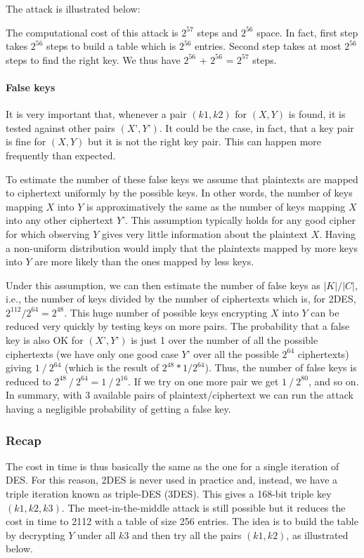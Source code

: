 The attack is illustrated below:


The computational cost of this attack is $2^{57}$ steps and $2^{56}$ space. In fact, first step takes $2^{56}$ steps to build a table which is $2^{56}$ entries. Second step takes at most $2^{56}$ steps to find the right key. We thus have $2^{56}$ + $2^{56}$ = $2^{57}$ steps.

\paragraph{False keys}

It is very important that, whenever a pair $(k1,k2)$ for $(X,Y)$ is found, it is tested against other pairs $(X’,Y’)$. It could be the case, in fact, that a key pair is fine for $(X,Y)$ but it is not the right key pair. This can happen more frequently than expected. 

To estimate the number of these false keys we assume that plaintexts are mapped to ciphertext uniformly by the possible keys. In other words, the number of keys mapping $X$ into $Y$ is approximatively the same as the number of keys mapping $X$ into any other ciphertext $Y’$. This assumption typically holds for any good cipher for which observing $Y$ gives very little information about the plaintext $X$. Having a non-uniform distribution would imply that the plaintexts mapped by more keys into $Y$ are more likely than the ones mapped by less keys.

Under this assumption, we can then estimate the number of false keys as $|K|/|C|$, i.e., the number of keys divided by the number of ciphertexts which is, for 2DES, $2^{112}/2^{64} = 2^{48}$. This huge number of possible keys encrypting $X$ into $Y$ can be reduced very quickly by testing keys on more pairs. The probability that a false key is also OK for $(X’,Y’)$ is just 1 over the number of all the possible ciphertexts (we have only one good case $Y’$ over all the possible $2^{64}$ ciphertexts) giving $1⁄2^{64}$ (which is the result of $2^{48} * 1/2^{64}$). Thus, the number of false keys is reduced to $2^{48}⁄2^{64} = 1⁄2^{16}$. If we try on one more pair we get $1⁄2^{80}$, and so on. In summary, with 3 available pairs of plaintext/ciphertext we can run the attack having a negligible probability of getting a false key.

\subsubsection{Recap}
The cost in time is thus basically the same as the one for a single iteration of DES. For this reason, 2DES is never used in practice and, instead, we have a triple iteration known as triple-DES (3DES). This gives a 168-bit triple key $(k1,k2,k3)$. The meet-in-the-middle attack is still possible but it reduces the cost in time to 2112 with a table of size 256 entries. The idea is to build the table by decrypting $Y$ under all $k3$ and then try all the pairs $(k1,k2)$, as illustrated below.

